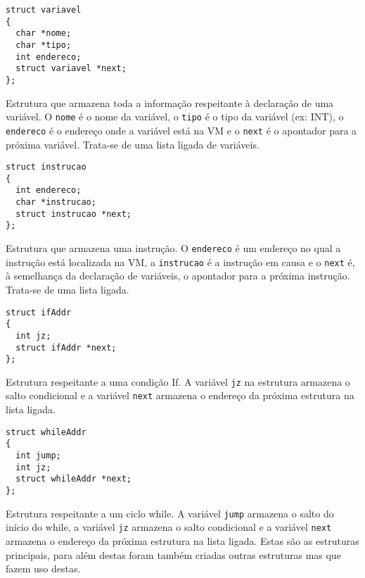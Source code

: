 \documentclass{report}
\begin{document}
\begin{verbatim}
struct variavel
{
  char *nome;
  char *tipo; 
  int endereco;
  struct variavel *next;
};
\end{verbatim}
Estrutura que armazena toda a informação respeitante à declaração de uma variável. O \texttt{nome} é o nome da variável, o \texttt{tipo} é o tipo da variável (ex: INT), o \texttt{endereco} é o endereço onde a variável está na VM e o \texttt{next} é o apontador para a próxima variável. Trata-se de uma lista ligada de variáveis.
 
\begin{verbatim}
struct instrucao
{
  int endereco;
  char *instrucao;
  struct instrucao *next;
};
\end{verbatim}
Estrutura que armazena uma instrução. O  \texttt{endereco} é um endereço no qual a instrução está localizada na VM, a  \texttt{instrucao} é a instrução em causa e  o  \texttt{next} é, à semelhança da declaração de variáveis, o apontador para a próxima instrução. Trata-se de uma lista ligada.
 
\begin{verbatim}
struct ifAddr
{
  int jz;
  struct ifAddr *next;
};
\end{verbatim}
Estrutura respeitante a uma condição If. A variável \texttt{jz} na estrutura armazena o salto condicional e a variável \texttt{next} armazena o endereço da próxima estrutura na lista ligada.
 
\begin{verbatim}
struct whileAddr
{
  int jump;
  int jz;
  struct whileAddr *next;
};
\end{verbatim}

Estrutura respeitante a um ciclo while. A variável  \texttt{jump} armazena o salto do início do while, a variável  \texttt{jz} armazena o salto condicional e a variável  \texttt{next} armazena o endereço da próxima estrutura na lista ligada.
\newline
\newline
Estas são as estruturas principais, para além destas foram também criadas outras estruturas mas que fazem uso destas.
 
\end{document}
